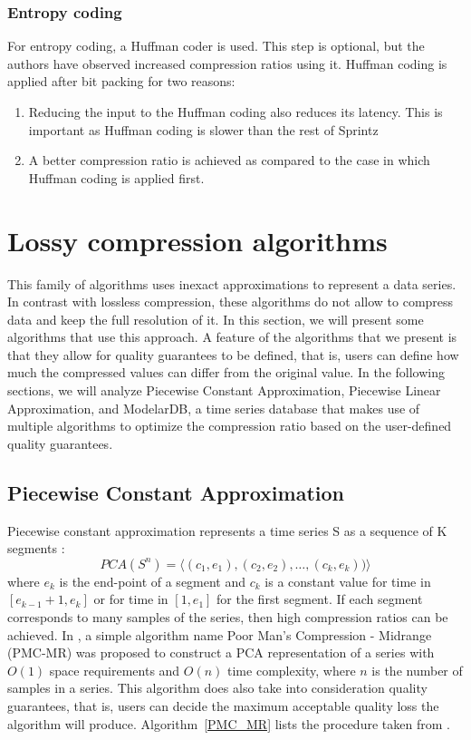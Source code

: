 \subsubsection{Entropy coding}
For entropy coding, a Huffman coder is used. This step is optional, but the authors have
observed increased compression ratios using it. Huffman coding is applied after bit packing
for two reasons:
\begin{enumerate}
    \item Reducing the input to the Huffman coding also reduces its latency. This is
    important as Huffman coding is slower than the rest of Sprintz
    \item A better compression ratio is achieved as compared to the case in which Huffman
    coding is applied first.
\end{enumerate}

\section{Lossy compression algorithms}
This family of algorithms uses inexact approximations to represent a data series. In
contrast with lossless compression, these algorithms do not allow to compress data and
keep the full resolution of it. In this section, we will present some algorithms that use
this approach. A feature of the algorithms that we present is that they allow for quality
guarantees to be defined, that is, users can define how much the compressed values can differ
from the original value. In the following sections, we will analyze Piecewise Constant
Approximation, Piecewise Linear Approximation, and ModelarDB, a time series database that
makes use of multiple algorithms to optimize the compression ratio based on the user-defined
quality guarantees.

\subsection{Piecewise Constant Approximation}
Piecewise constant approximation represents a time series S as a sequence of K segments
\cite{Keogh2001Locally}\cite{Lazaridis2003Capturing}:
$$PCA(S^n) = \langle(c_1, e_1), (c_2, e_2), \ldots, (c_k, e_k))\rangle$$
where $e_k$  is the end-point of a segment and $c_k$ is a constant value for time in
$[e_{k-1} + 1, e_k]$ or for time in $[1, e_1]$ for the first segment. If each segment
corresponds to many samples of the series, then high compression ratios can be achieved.
In \cite{Lazaridis2003Capturing}, a simple algorithm name Poor Man’s Compression -
Midrange (PMC-MR) was proposed to construct a PCA  representation of a series with
$O(1)$ space requirements and $O(n)$ time complexity, where $n$ is the number of samples
in a series. This algorithm does also take into consideration quality guarantees, that
is, users can decide the maximum acceptable quality loss the algorithm will produce.
Algorithm~\ref{PMC_MR} lists the procedure taken from \cite{Lazaridis2003Capturing}.

